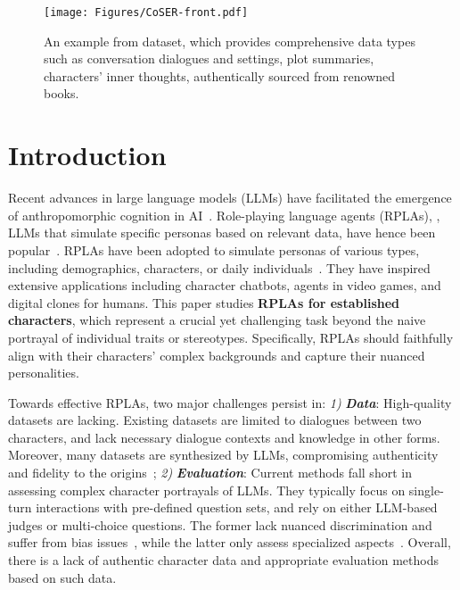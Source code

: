 \begin{figure}[!t]
    \centering
    \texttt{[image: Figures/CoSER-front.pdf]}
    \caption{
    An example from \method dataset, which provides 
    comprehensive data types 
    such as conversation dialogues and settings, plot summaries, characters' inner thoughts, authentically sourced from renowned books.
    }
    \label{fig:front}
\end{figure}

\section{Introduction}
Recent advances in large language models (LLMs) have facilitated the emergence of anthropomorphic cognition in AI~\citep{kosinski2023theory, shanahan2023role}.
Role-playing language agents (RPLAs), \ie, LLMs that simulate specific personas based on relevant data, have hence been popular~\citep{Park2023GenerativeAgents}.
RPLAs have been adopted to simulate personas of various types, including demographics, characters, or daily individuals~\citep{chen2024from}.
They have inspired extensive applications including character chatbots, agents in video games, and digital clones for humans. 
This paper studies \textbf{RPLAs for established characters}, which represent a crucial yet challenging task beyond the naive portrayal of individual traits or stereotypes. 
Specifically, RPLAs should faithfully align with their characters' complex backgrounds and capture their nuanced personalities.

Towards effective RPLAs, two major challenges persist in:
\textit{1)} \textbf{\textit{Data}}: High-quality datasets are lacking.
Existing datasets are limited to dialogues between two characters, and lack necessary dialogue contexts and knowledge in other forms.
Moreover, many datasets are synthesized by LLMs, compromising authenticity and fidelity to the origins~\citep{wang2023rolellm, lu2024large};
\textit{2)}  \textbf{\textit{Evaluation}}: Current methods fall short in assessing complex character portrayals of LLMs. 
They typically focus on single-turn interactions with pre-defined question sets, and rely on either LLM-based judges or multi-choice questions. 
The former lack nuanced discrimination and suffer from bias issues~\citep{li2024judgesurvey}, while the latter only assess specialized aspects~\citep{xu2024character}.
Overall, there is a lack of authentic character data and appropriate evaluation methods based on such data. 


